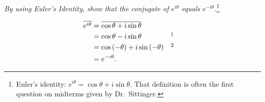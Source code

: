 \documentclass{tufte-handout}
\begin{document}
\begin{description}
\item \textit{By using Euler's Identity, show that the conjugate of
    $e^{i \theta}$ equals $e^{-i \theta}$.}\footnote{Euler's identity:
    $e^{i\theta} = \cos\theta + i\sin\theta$. That definition is often
    the first question on midterms given by Dr.\ Sittinger.}
\end{description}

\begin{align*}
  \overline{e^{i \theta}} &= \overline{\cos \theta + i \sin \theta}\\
                          &= \cos \theta - i \sin \theta && \footnotemark\\
                          &= \cos{(-\theta)} + i \sin{(-\theta)} && \footnotemark\\
                          &= e^{-i \theta}.
\end{align*}
  
\end{document}
